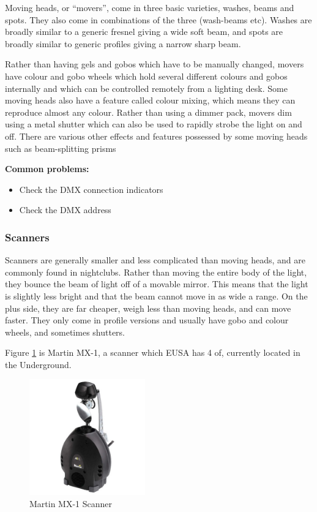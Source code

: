 \documentclass[14pt]{article} %
\begin{document}
Moving heads, or “movers”, come in three basic varieties, washes, beams and spots. They also come in combinations of the three (wash-beams etc). Washes are broadly similar to a generic fresnel giving a wide soft beam, and spots are broadly similar to generic profiles giving a narrow sharp beam.

Rather than having gels and gobos which have to be manually changed, movers have colour and gobo wheels which hold several different colours and gobos internally and which can be controlled remotely from a lighting desk. Some moving heads also have a feature called colour mixing, which means they can reproduce almost any colour. Rather than using a dimmer pack, movers dim using a metal shutter which can also be used to rapidly strobe the light on and off. There are various other effects and features possessed by some moving heads such as beam-splitting prisms

\textbf{Common problems:}

\begin{itemize}
\item Check the DMX connection indicators
\item Check the DMX address
\end{itemize}

\subsubsection{Scanners}

Scanners are generally smaller and less complicated than moving heads, and are commonly found in nightclubs. Rather than moving the entire body of the light, they bounce the beam of light off of a movable mirror. This means that the light is slightly less bright and that the beam cannot move in as wide a range. On the plus side, they are far cheaper, weigh less than moving heads, and can move faster. They only come in profile versions and usually have gobo and colour wheels, and sometimes shutters. 

Figure \ref{fig:scanner} is Martin MX-1, a scanner which EUSA has 4 of, currently located in the Underground.

\begin{figure}[h]
\begin{center}

\includegraphics[height=5cm]{mx1.jpg}
\caption{Martin MX-1 Scanner}
\label{fig:scanner}

\end{center}
\end{figure}
\end{document}
